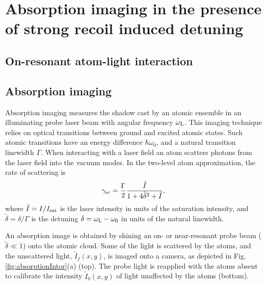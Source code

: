 
\renewcommand{\thechapter}{4}


\chapter{Absorption imaging in the presence of strong recoil induced detuning}


\section{On-resonant atom-light interaction}

\section{Absorption imaging}
Absorption imaging measures the shadow cast by an atomic ensemble in an illuminating probe laser beam with angular frequency $\omega_{\rm{L}}$. This imaging technique relies on optical transitions between ground and excited atomic states. Such atomic transitions have an energy difference $\hbar\omega_0$, and a natural transition linewidth $\Gamma$. When interacting with a laser field an atom scatters photons from the laser field into the vacuum modes. In the two-level atom approximation, the rate of scattering is \cite{LCT}
\begin{equation}
\gamma_{\rm{sc}}= \frac{\Gamma}{2} \frac{\tilde{I}}{1+4\tilde{\delta}^2 +\tilde{I}},
\label{eq:scatrate}
\end{equation}
where $\tilde{I}=I/I_{\rm{sat}}$ is the laser intensity in units of the saturation intensity, and $\tilde{\delta}=\delta/\Gamma$ is the detuning $\delta=\omega_{\rm{L}}-\omega_0$ in units of the natural linewidth. 
\par An absorption image is obtained by shining an on- or near-resonant probe beam ($\tilde{\delta}\ll1$) onto the atomic cloud. Some of the light is scattered by the atoms, and the unscattered light, $\tilde{I}_f(x,y)$, is imaged onto a camera, as depicted in Fig. \ref{fig:absorptionIntor}(a) (top). The probe light is reapplied with the atoms absent to calibrate the intensity $\tilde{I}_0(x,y)$ of light unaffected by the atoms (bottom).
